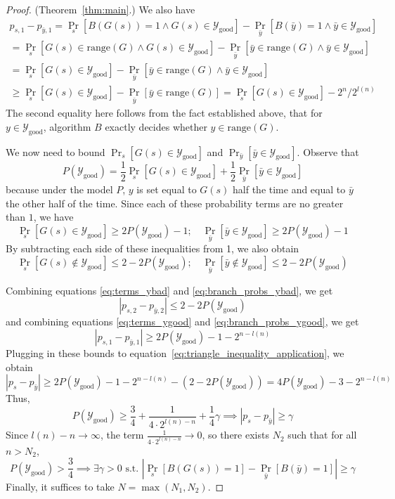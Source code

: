 \documentclass{article}
\def \Ygood{\mathcal{Y}_\text{good}}
\def \by{{\bar{y}}}
\theoremstyle{definition}
\theoremstyle{remark}
\begin{document}
\begin{proof}{(Theorem~\ref{thm:main}.)}
We also have
\begin{multline} \label{eq:terms_ygood}
p_{s, 1} - p_{\by, 1} =
\Pr_s[B(G(s)) = 1 \wedge G(s) \in \Ygood] - \Pr_\by[B(\by) = 1 \wedge \by \in \Ygood]
 \\
= 
\Pr_s[G(s) \in \text{range}(G) \wedge G(s) \in \Ygood] -
\Pr_\by[\by \in \text{range}(G) \wedge \by \in \Ygood]
\\
= \Pr_s[G(s) \in \Ygood] - \Pr_\by[\by \in \text{range}(G) \wedge \by \in \Ygood] \\
\geq \Pr_s[G(s) \in \Ygood] - \Pr_\by[\by \in \text{range}(G)] 
= \Pr_s[G(s) \in \Ygood] - 2^n/2^{l(n)}
\end{multline}
The second equality here follows from the fact established above, that for $y \in \Ygood$, algorithm $B$ exactly decides whether $y \in \text{range}(G)$.

We now need to bound $\Pr_s[G(s) \in \Ygood]$ and $\Pr_\by[\by \in \Ygood]$.
Observe that
$$
P(\Ygood) = \frac{1}{2}\Pr_s[G(s) \in \Ygood] + \frac{1}{2}\Pr_\by[\by \in \Ygood]
$$
because under the model $P$, $y$ is set equal to $G(s)$ half the time and equal to $\by$ the other half of the time.
Since each of these probability terms are no greater than $1$, we have
\begin{equation} \label{eq:branch_probs_ygood}
\Pr_s[G(s) \in \Ygood] \geq 2P(\Ygood) - 1;
\quad
\Pr_\by[\by \in \Ygood] \geq 2P(\Ygood) - 1        
\end{equation}
By subtracting each side of these inequalities from 1, we also obtain
\begin{equation} \label{eq:branch_probs_ybad}
\Pr_s[G(s) \notin \Ygood] \leq 2 - 2P(\Ygood);
\quad
\Pr_\by[\by \notin \Ygood] \leq 2 - 2P(\Ygood)
\end{equation}

Combining equations \ref{eq:terms_ybad} and \ref{eq:branch_probs_ybad}, we get
\begin{equation}
|p_{s, 2} - p_{\by, 2}| \leq 2 - 2P(\Ygood)    
\end{equation}
and combining equations \ref{eq:terms_ygood} and \ref{eq:branch_probs_ygood}, we get
\begin{equation} \label{eq:term1s_err_bound}
|p_{s, 1} - p_{\by, 1}| \geq 2P(\Ygood) - 1 - 2^{n - l(n)}    
\end{equation}
Plugging in these bounds to equation~\ref{eq:triangle_inequality_application}, we obtain
\begin{equation} \label{eq:final_ps_py_bound}
|p_s - p_\by| \geq
2P(\Ygood) - 1 - 2^{n - l(n)}
- (2 - 2P(\Ygood))
= 4 P(\Ygood) - 3 - 2^{n - l(n)}
\end{equation}
Thus, 
$$
P(\Ygood) \geq \frac{3}{4} + \frac{1}{4 \cdot 2^{l(n) - n}} + \frac{1}{4}\gamma
\implies |p_s - p_\by| \geq \gamma
$$
Since $l(n) - n \to \infty$, the term $\frac{1}{4 \cdot 2^{l(n) - n}} \to 0$,
so there exists $N_2$ such that for all $n > N_2$,
$$
P(\Ygood) > \frac{3}{4} \implies \exists \gamma > 0 \text{ s.t. } |\Pr_s[B(G(s)) = 1] - \Pr_{\bar{y}}[B(\bar{y}) = 1]| \geq \gamma
$$
Finally, it suffices to take $N = \max(N_1, N_2)$.


\end{proof}
\end{document}
